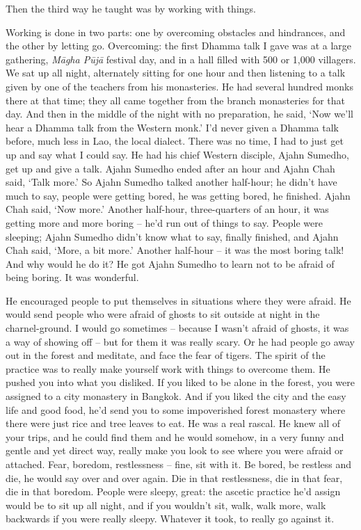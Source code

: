 Then the third way he taught was by working with things. 

Working is done in two parts: one by overcoming obstacles and
hindrances, and the other by letting go. Overcoming: the first Dhamma
talk I gave was at a large gathering, \emph{Māgha Pūjā} festival
day, and in a hall filled with 500 or 1,000 villagers. We sat up all
night, alternately sitting for one hour and then listening to a talk
given by one of the teachers from his monasteries. He had several
hundred monks there at that time; they all came together from the branch
monasteries for that day. And then in the middle of the night with no
preparation, he said, `Now we'll hear a Dhamma talk from the Western
monk.' I'd never given a Dhamma talk before, much less in Lao, the local
dialect. There was no time, I had to just get up and say what I could
say. He had his chief Western disciple, Ajahn Sumedho, get up and give a
talk. Ajahn Sumedho ended after an hour and Ajahn Chah said, `Talk
more.' So Ajahn Sumedho talked another half-hour; he didn't have much to
say, people were getting bored, he was getting bored, he finished. Ajahn
Chah said, `Now more.' Another half-hour, three-quarters of an hour, it
was getting more and more boring -- he'd run out of things to say. 
People were sleeping; Ajahn Sumedho didn't know what to say, finally
finished, and Ajahn Chah said, `More, a bit more.' Another half-hour
-- it was the most boring talk! And why would he do it? He got Ajahn
Sumedho to learn not to be afraid of being boring. It was wonderful. 

He encouraged people to put themselves in situations where they were
afraid. He would send people who were afraid of ghosts to sit outside at
night in the charnel-ground. I would go sometimes -- because I wasn't
afraid of ghosts, it was a way of showing off -- but for them it was
really scary. Or he had people go away out in the forest and meditate, 
and face the fear of tigers. The spirit of the practice was to really
make yourself work with things to overcome them. He pushed you into what
you disliked. If you liked to be alone in the forest, you were assigned
to a city monastery in Bangkok. And if you liked the city and the easy
life and good food, he'd send you to some impoverished forest monastery
where there were just rice and tree leaves to eat. He was a real rascal. 
He knew all of your trips, and he could find them and he would somehow, 
in a very funny and gentle and yet direct way, really make you look to
see where you were afraid or attached. Fear, boredom, restlessness --
fine, sit with it. Be bored, be restless and die, he would say over and
over again. Die in that restlessness, die in that fear, die in that
boredom. People were sleepy, great: the ascetic practice he'd assign
would be to sit up all night, and if you wouldn't sit, walk, walk more, 
walk backwards if you were really sleepy. Whatever it took, to really go
against it. 

